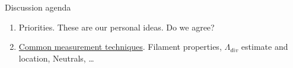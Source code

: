 \documentclass[10pt, compress]{beamer}
\begin{document}
\begin{frame}{Discussion agenda}
	\begin{enumerate}
		\item Priorities. These are our personal ideas. Do we agree? 
		\item \underline{Common measurement techniques}. Filament
                  properties, $\Lambda_{div}$ estimate and location,
                  Neutrals, \ldots 
 	\end{enumerate}
\end{frame}
\end{document}
